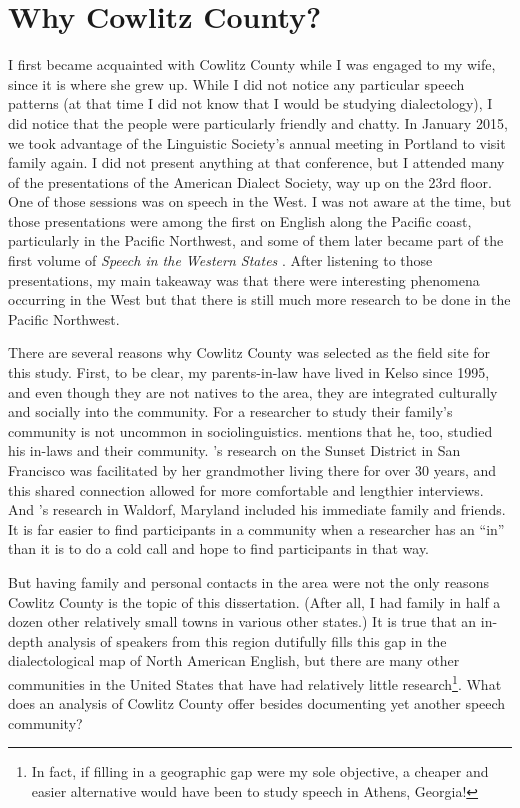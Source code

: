 \section{Why Cowlitz County?}
\label{sec:why_cowlitz_county}

I first became acquainted with Cowlitz County while I was engaged to my wife, since it is where she grew up. While I did not notice any particular speech patterns (at that time I did not know that I would be studying dialectology), I did notice that the people were particularly friendly and chatty. In January 2015, we took advantage of the Linguistic Society's annual meeting in Portland to visit family again. I did not present anything at that conference, but I attended many of the presentations of the American Dialect Society, way up on the 23rd floor. One of those sessions was on speech in the West. I was not aware at the time, but those presentations were among the first on English along the Pacific coast, particularly in the Pacific Northwest, and some of them later became part of the first volume of \textit{Speech in the Western States} \citep{fridland_etal_2016_pads}. After listening to those presentations, my main takeaway was that there were interesting phenomena occurring in the West but that there is still much more research to be done in the Pacific Northwest.

There are several reasons why Cowlitz County was selected as the field site for this study. First, to be clear, my parents-in-law have lived in Kelso since 1995, and even though they are not natives to the area, they are integrated culturally and socially into the community. For a researcher to study their family’s community is not uncommon in sociolinguistics. \citet{hazen_2000_pads} mentions that he, too, studied his in-laws and their community. \citeauthor{hall_lew_2009_diss}'s \citeyearpar{hall_lew_2009_diss} research on the Sunset District in San Francisco was facilitated by her grandmother living there for over 30 years, and this shared connection allowed for more comfortable and lengthier interviews. And \citeauthor{bowie_2000_diss}'s \citeyearpar[41]{bowie_2000_diss} research in Waldorf, Maryland included his immediate family and friends. It is far easier to find participants in a community when a researcher has an “in” than it is to do a cold call and hope to find participants in that way.

But having family and personal contacts in the area were not the only reasons Cowlitz County is the topic of this dissertation. (After all, I had family in half a dozen other relatively small towns in various other states.)
It is true that an in-depth analysis of speakers from this region dutifully fills this gap in the dialectological map of North American English, but there are many other communities in the United States that have had relatively little research\footnote{In fact, if filling in a geographic gap were my sole objective, a cheaper and easier alternative would have been to study speech in Athens, Georgia!}. What does an analysis of Cowlitz County offer besides documenting yet another speech community?


